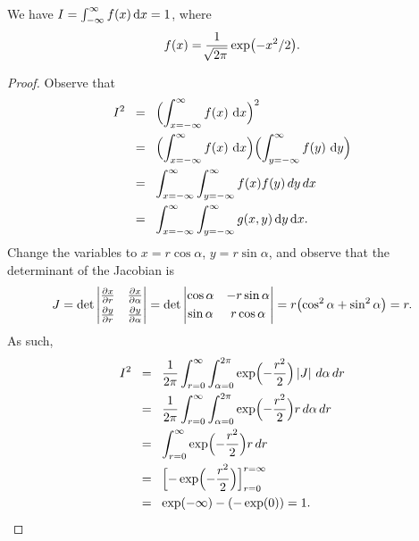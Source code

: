 \begin{lemma}
    We have $I = \int_{-\infty}^\infty f(x) \mathop{}\!\mathrm{d}x = 1$, where
    \begin{equation*}
        f(x) = \frac{1}{\mysqrt{2\pi}} \exp \pth{ -x^2/2}.
    \end{equation*}
\end{lemma}
\begin{proof}
    Observe that 
    \begin{align*}
      I^2
      &\EQ%
        \Bigl(\int_{x=-\infty}^\infty f(x)\, \diffX{x} \Bigr)^2%
        \\&
        \EQ
        \Bigl( \int_{x=-\infty}^\infty f(x)\, \diffX{x} \Bigr)
        \Bigl( \int_{y=-\infty}^\infty f(y)\, \diffX{y} \Bigr)
        \\&
        \EQ
        \int_{x=-\infty}^\infty
        \int_{y=-\infty}^\infty f(x) f(y)\, dy \, dx
      \\&%
      \EQ
      \int_{x=-\infty}^\infty
      \int_{y=-\infty}^\infty g(x, y) \diffX{y} \diffX{x}.
    \end{align*}
    Change the variables to $x=r \cos \alpha$, $y = r\sin \alpha$, and
    observe that the determinant of the Jacobian is
    \[
    J = 
    \det \cardin{\begin{matrix}
           \frac{\partial x}{\partial r} 
           &
           \frac{\partial x}{\partial \alpha}\\[0.1cm]
           \frac{\partial y}{\partial r} 
           &
           \frac{\partial y}{\partial \alpha} 
       \end{matrix}}
    =%
    \det \cardin{\begin{matrix}%
           \cos \alpha &
           -r \sin \alpha  \\[0.1cm]
           \sin \alpha & r \cos \alpha
       \end{matrix}}
    = r \pth[]{\cos^2 \alpha + \sin^2 \alpha } = r.
    \]
    As such, 
    \begin{align*}
        I^2
        &\EQ
            \frac{1}{2\pi} \int_{r=0}^\infty \int_{\alpha=0}^{2\pi} \exp
            \Bigl( -\frac{r^2}{2} \Bigr) \cardin{J} \, d\alpha \, dr%
            \\&
            \EQ
            \frac{1}{2\pi} \int_{r=0}^\infty \int_{\alpha=0}^{2\pi} \exp
            \Bigl({ -\frac{r^2}{2}}\Bigr) r \, d\alpha \, dr
      \\
          &\EQ
            \int_{r=0}^\infty
            \exp \Bigl( -\frac{r^2}{2} \Bigr) r \, dr
            \\&
            \EQ
            \Bigl[ - \exp\Bigl( -\frac{r^2}{2} \Bigr) \Bigr]_{r=0}^{r=\infty}
            \\&
            \EQ%
            \exp( -\infty) - (-\exp( 0 ) ) = 1.
    \end{align*}
\end{proof}

